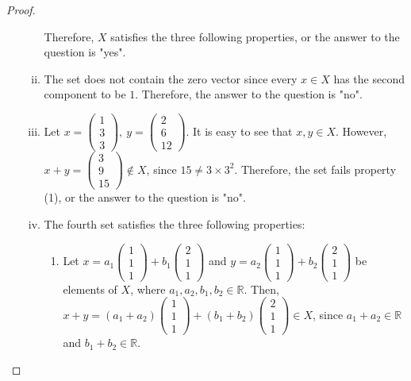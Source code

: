 \begin{proof}
\begin{enumerate}[(a)]
\begin{enumerate}[(i)]
        Therefore, $X$ satisfies the three following properties, or the answer to the question is "yes".
        \item The set does not contain the zero vector since every $x\in X$ has the second component to be $1$. Therefore, the answer to the question is "no".
        \item Let $x=\begin{pmatrix}1\\3\\3\end{pmatrix},\: y=\begin{pmatrix}2\\6\\12\end{pmatrix}$. It is easy to see that $x, y\in X$. However, $x+y=\begin{pmatrix}3\\9\\15\end{pmatrix}\not\in X$, since $15\not=3\times3^2$. Therefore, the set fails property (1), or the answer to the question is "no". 
        \item The fourth set satisfies the three following properties:
        \begin{enumerate}[(1)]
            \item Let $x = a_1\begin{pmatrix}1\\1\\1\end{pmatrix}+b_1\begin{pmatrix}2\\1\\1\end{pmatrix}$ and $y = a_2\begin{pmatrix}1\\1\\1\end{pmatrix}+b_2\begin{pmatrix}2\\1\\1\end{pmatrix}$ be elements of $X$, where $a_1, a_2, b_1, b_2\in\mathbb{R}$. Then, $x+y=(a_1+a_2)\begin{pmatrix}1\\1\\1\end{pmatrix}+(b_1+b_2)\begin{pmatrix}2\\1\\1\end{pmatrix}\in X$, since $a_1 + a_2\in\mathbb{R}$ and $b_1 + b_2\in\mathbb{R}$.

\end{enumerate}
\end{enumerate}
\end{enumerate}
\end{proof}
